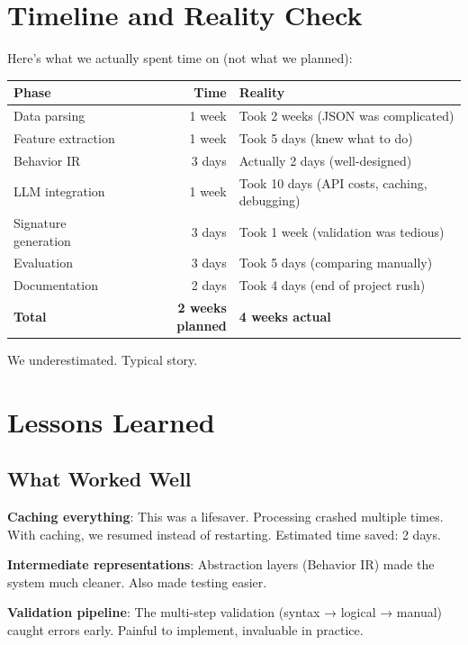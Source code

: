 \documentclass[11pt]{article}
\begin{document}
\section{Timeline and Reality Check}

Here's what we actually spent time on (not what we planned):

\begin{table}[h]
\centering
\small
\begin{tabular}{l|r|l}
\toprule
\textbf{Phase} & \textbf{Time} & \textbf{Reality} \\
\midrule
Data parsing & 1 week & Took 2 weeks (JSON was complicated) \\
Feature extraction & 1 week & Took 5 days (knew what to do) \\
Behavior IR & 3 days & Actually 2 days (well-designed) \\
LLM integration & 1 week & Took 10 days (API costs, caching, debugging) \\
Signature generation & 3 days & Took 1 week (validation was tedious) \\
Evaluation & 3 days & Took 5 days (comparing manually) \\
Documentation & 2 days & Took 4 days (end of project rush) \\
\midrule
\textbf{Total} & \textbf{2 weeks planned} & \textbf{4 weeks actual} \\
\bottomrule
\end{tabular}
\end{table}

We underestimated. Typical story.

\section{Lessons Learned}

\subsection{What Worked Well}

\textbf{Caching everything}: This was a lifesaver. Processing crashed multiple times. With caching, we resumed instead of restarting. Estimated time saved: 2 days.

\textbf{Intermediate representations}: Abstraction layers (Behavior IR) made the system much cleaner. Also made testing easier.

\textbf{Validation pipeline}: The multi-step validation (syntax → logical → manual) caught errors early. Painful to implement, invaluable in practice.
\end{document}
